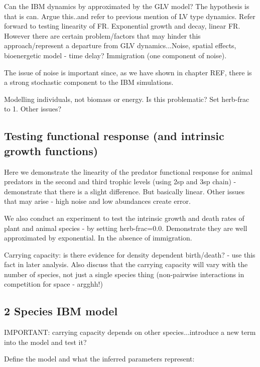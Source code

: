 Can the IBM dynamics by approximated by the GLV model? The hypothesis is that is can. Argue this..and refer to previous mention of LV type dynamics. Refer forward to testing linearity of FR. Exponential growth and decay, linear FR. However there are certain problem/factors that may hinder this approach/represent a departure from GLV dynamics...Noise, spatial effects, bioenergetic model - time delay? Immigration (one component of noise).

The issue of noise is important since, as we have shown in chapter REF, there is a strong stochastic component to the IBM simulations. 

Modelling individuals, not biomass or energy. Is this problematic? Set herb-frac to 1. Other issues?

\subsection{Testing functional response (and intrinsic growth functions)}

Here we demonstrate the linearity of the predator functional response for animal predators in the second and third trophic levels (using 2sp and 3sp chain) - demonstrate that there is a slight difference. But basically linear. Other issues that may arise - high noise and low abundances create error. 

We also conduct an experiment to test the intrinsic growth and death rates of plant and animal species - by setting herb-frac=0.0. Demonstrate they are well approximated by exponential. In the absence of immigration. 

Carrying capacity: is there evidence for density dependent birth/death? - use this fact in later analysis. Also discuss that the carrying capacity will vary with the number of species, not just a single species thing (non-pairwise interactions in competition for space - argghh!)

\subsection{2 Species IBM model}

IMPORTANT: carrying capacity depends on other species...introduce a new term into the model and test it?

Define the model and what the inferred parameters represent:

